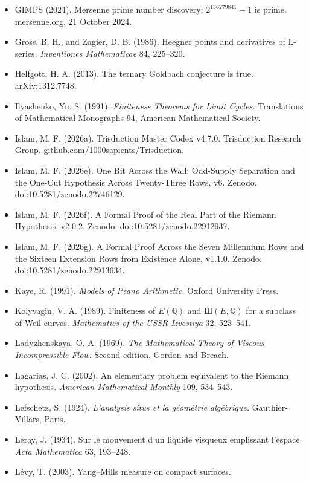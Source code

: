 \documentclass[10pt]{article}
\begin{document}
\begin{itemize}
{  Academy of Sciences} 24, 556--557.
\item
  GIMPS (2024). Mersenne prime number discovery: \(2^{136279841} - 1\)
  is prime. mersenne.org, 21 October 2024.
\item
  Gross, B. H., and Zagier, D. B. (1986). Heegner points and derivatives
  of L-series. \emph{Inventiones Mathematicae} 84, 225--320.
\item
  Helfgott, H. A. (2013). The ternary Goldbach conjecture is true.
  arXiv:1312.7748.
\item
  Ilyashenko, Yu. S. (1991). \emph{Finiteness Theorems for Limit
  Cycles.} Translations of Mathematical Monographs 94, American
  Mathematical Society.
\item
  Islam, M. F. (2026a). Trisduction Master Codex v4.7.0. Trisduction
  Research Group. github.com/1000sapients/Trisduction.
\item
  Islam, M. F. (2026e). One Bit Across the Wall: Odd-Supply Separation
  and the One-Cut Hypothesis Across Twenty-Three Rows, v6. Zenodo.
  doi:10.5281/zenodo.22746129.
\item
  Islam, M. F. (2026f). A Formal Proof of the Real Part of the Riemann
  Hypothesis, v2.0.2. Zenodo. doi:10.5281/zenodo.22912937.
\item
  Islam, M. F. (2026g). A Formal Proof Across the Seven Millennium Rows
  and the Sixteen Extension Rows from Existence Alone, v1.1.0. Zenodo.
  doi:10.5281/zenodo.22913634.
\item
  Kaye, R. (1991). \emph{Models of Peano Arithmetic.} Oxford University
  Press.
\item
  Kolyvagin, V. A. (1989). Finiteness of \(E(\mathbb{Q})\) and
  Ш\((E, \mathbb{Q})\) for a subclass of Weil curves. \emph{Mathematics
  of the USSR-Izvestiya} 32, 523--541.
\item
  Ladyzhenskaya, O. A. (1969). \emph{The Mathematical Theory of Viscous
  Incompressible Flow.} Second edition, Gordon and Breach.
\item
  Lagarias, J. C. (2002). An elementary problem equivalent to the
  Riemann hypothesis. \emph{American Mathematical Monthly} 109,
  534--543.
\item
  Lefschetz, S. (1924). \emph{L'analysis situs et la géométrie
  algébrique.} Gauthier-Villars, Paris.
\item
  Leray, J. (1934). Sur le mouvement d'un liquide visqueux emplissant
  l'espace. \emph{Acta Mathematica} 63, 193--248.
\item
  Lévy, T. (2003). Yang--Mills measure on compact surfaces.

\end{itemize}
\end{document}

